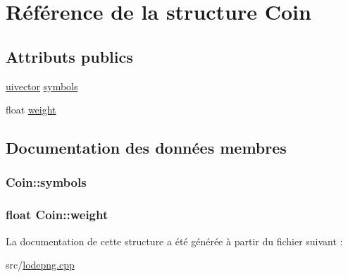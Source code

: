 \hypertarget{struct_coin}{}\section{Référence de la structure Coin}
\label{struct_coin}
\subsection*{Attributs publics}
\begin{DoxyCompactItemize}
\item 
\hyperlink{structuivector}{uivector} \hyperlink{struct_coin_a1d6bc1176bb9fcbd9ca8c781c92ef432}{symbols}
\item 
float \hyperlink{struct_coin_a0427f9a678a9ce031a254f40f06b3669}{weight}
\end{DoxyCompactItemize}


\subsection{Documentation des données membres}
\hypertarget{struct_coin_a1d6bc1176bb9fcbd9ca8c781c92ef432}{}
\subsubsection[{symbols}]{ Coin\+::symbols}\label{struct_coin_a1d6bc1176bb9fcbd9ca8c781c92ef432}
\hypertarget{struct_coin_a0427f9a678a9ce031a254f40f06b3669}{}
\subsubsection[{weight}]{\setlength{\rightskip}{0pt plus 5cm}float Coin\+::weight}\label{struct_coin_a0427f9a678a9ce031a254f40f06b3669}


La documentation de cette structure a été générée à partir du fichier suivant \+:\begin{DoxyCompactItemize}
\item 
src/\hyperlink{lodepng_8cpp}{lodepng.\+cpp}\end{DoxyCompactItemize}
